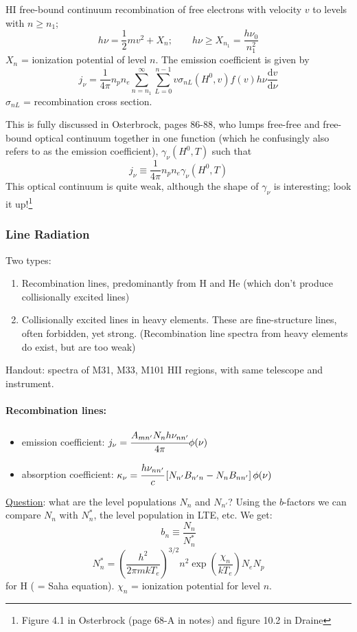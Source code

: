 \documentclass[11pt]{article}
\newcommand{\mar}[1]{\hspace{0pt}\marginpar{-\textcolor{black}{#1}-}}
\begin{document}
HI free-bound continuum recombination of free electrons with velocity $v$
to levels with $n \geq n_{1}$;
\[
    h\nu = \frac{1}{2}mv^{2} + X_{n}; \qquad
    h\nu \geq X_{n_{1}} = \frac{h\nu_{0}}{n_{1}^{2}}
    \]
$X_{n}$ = ionization potential of level $n$. The emission coefficient
is given by
\[
    j_{\nu} = \frac{1}{4\pi} n_{p}n_{e} \sum_{n=n_{1}}^{\infty} {
        \sum_{L=0}^{n-1} {
            v \sigma_{nL} (H^{0}, v) f(v) h\nu \frac{\mathrm{d}v}{\mathrm{d}\nu}
        }
    }
    \]
$\sigma_{nL}$ = recombination cross section.

This is fully discussed in Osterbrock, pages 86-88, who lumps free-free
and free-bound optical continuum together in one function (which he
confusingly also refers to as the emission coefficient),
$ \gamma_{\nu}(H^{0}, T) $ such that
\[
    j_{\nu} \equiv \frac{1}{4\pi} n_{p}n_{e} \gamma_{\nu} (H^{0},T)
    \]
This optical continuum is quite weak, although the shape of $\gamma_{\nu}$
is interesting; look it up!\footnote{Figure 4.1 in Osterbrock
(page 68-A in notes) and figure 10.2 in Draine}

\subsubsection{Line Radiation}
\mar{69}Two types:
\begin{enumerate}
    \item Recombination lines, predominantly from H and He
        (which don't produce collisionally excited lines)
    \item Collisionally excited lines in heavy elements.
        These are fine-structure lines, often forbidden, yet strong.
        (Recombination line spectra from heavy elements do exist, but are too weak)
\end{enumerate}

Handout: spectra of M31, M33, M101 HII regions, with same
telescope and instrument.

\paragraph{Recombination lines:}
\begin{itemize}[itemsep=1ex]
    \item emission coefficient:
        $ j_{\nu} = \cfrac{A_{mn'} N_{n} h\nu_{nn'}}{4\pi} \phi(\nu) $
    \item absorption coefficient:
        $ \kappa_{\nu} = \cfrac{h\nu_{nn'}}{c} \left[
            N_{n'} B_{n'n} - N_{n} B_{nn'} \right] \phi(\nu)$
\end{itemize}
\underline{Question}: what are the level populations $N_{n}$ and $N_{n'}$?
Using the $b$-factors we can compare $N_{n}$ with $N_{n}^{*}$, the level
population in LTE, etc. We get:
\[
    b_{n} \equiv \frac{N_{n}}{N_{n}^{*}}
    \]
\[
    N_{n}^{*}
    = \left( \frac{h^{2}}{2{\pi}mkT_{e}}
    \right)^{3/2} n^{2} \exp \left( \frac{\chi_{n}}{kT_{e}}
    \right) N_{e} N_{p}
    \]
for H ( = Saha equation). $\chi_{n}$ = ionization potential for level $n$.
\end{document}
